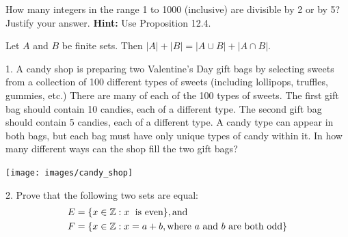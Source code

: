 \documentclass[10pt]{beamer}
\begin{document}
\begin{frame}
\footnotesize 
%
 \begin{mygreenbox}[title=Reading Quiz (Set Operations)]
How many integers in the range 1 to 1000 (inclusive) are divisible by 2 or by 5?  Justify your answer. \textbf{Hint:} Use Proposition 12.4.
\end{mygreenbox}

\vfill 


\begin{myyellowbox}[title=Proposition 12.4 (Scheinerman)]
Let $A$ and $B$ be finite sets.  Then \quad $|A| + |B| = |A \cup B| + |A \cap B|$.
\end{myyellowbox}
\vfill 

 \begin{myredbox}[title=\text{Problems Quiz (Lists, Factorials, and Intro to Sets)}]

	\begin{minipage}{0.72\textwidth}
	1. A candy shop is preparing two Valentine’s Day  gift bags by selecting sweets from a collection of 100 different types of sweets (including lollipops, truffles, gummies, etc.)   There are many of each of the 100 types of sweets.  The first gift bag should contain 10 candies, each of a different type. The second gift bag should contain 5 candies, each of a different type.  A candy type can appear in both bags, but each bag must have only unique types of candy within it. In how many different ways can the shop fill the two gift bags?
	    \end{minipage}
		\hfill 
	    \begin{minipage}{0.26\textwidth}
	        \centering
	        \texttt{[image: images/candy\_shop]} 
	    \end{minipage}
	
\vspace{0.15cm}
2. Prove that the following two sets are equal:
%
\begin{align*}
E &= \{ {x \in \mathbb{Z}: x \text{\; is even}} \}, \text{and} \\
F &= \{ {x \in \mathbb{Z}: x=a+b, \text{where $a$ and $b$ are both odd}} \}
\end{align*}
%
\end{myredbox}

\end{frame}
\end{document}
